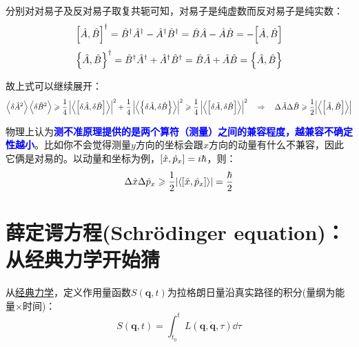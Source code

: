 分别对对易子及反对易子取复共轭可知，对易子是纯虚数而反对易子是纯实数：
\[\comm{\hat{A}}{\hat{B}}^{\dagger}=\hat{B}^{\dagger}\hat{A}^{\dagger}-\hat{A}^{\dagger}\hat{B}^{\dagger}=\hat{B}\hat{A}-\hat{A}\hat{B}=-\comm{\hat{A}}{\hat{B}}\]
\[\qty{\hat{A},\hat{B}}^{\dagger}=\hat{B}^{\dagger}\hat{A}^{\dagger}+\hat{A}^{\dagger}\hat{B}^{\dagger}=\hat{B}\hat{A}+\hat{A}\hat{B}=\qty{\hat{A},\hat{B}}\]

故上式可以继续展开：
\[\left \langle \delta\hat{A}^2 \right \rangle\left \langle \delta\hat{B}^2 \right \rangle \geqslant \frac{1}{4} \left | \left \langle \comm{\delta\hat{A}}{\delta\hat{B}} \right \rangle \right |^2 +\frac{1}{4} \left |\left \langle \qty{\delta\hat{A},\delta\hat{B}} \right \rangle \right |^2 \geqslant \frac{1}{4} \left | \left \langle \comm{\delta\hat{A}}{\delta\hat{B}} \right \rangle \right |^2 \quad \Rightarrow \quad \Delta \hat{A}\Delta \hat{B} \geqslant \frac{1}{2}\qty|\left \langle \comm{\hat{A}}{\hat{B}} \right \rangle|\]

物理上认为\textcolor{blue}{\textbf{测不准原理提供的是两个算符（测量）之间的兼容程度，越兼容不确定性越小}}。比如你不会觉得测量$y$方向的坐标会跟$x$方向的动量有什么不兼容，因此它俩是对易的。以动量和坐标为例，$\comm{\hat{x}}{\hat{p}_x}=i\hbar$，则：
\[\Delta \hat{x}\Delta \hat{p}_x \geqslant \frac{1}{2}\qty|\left \langle \comm{\hat{x}}{\hat{p}_x} \right \rangle|=\frac{\hbar}{2}\]

\section{薛定谔方程(Schrödinger equation)：从经典力学开始猜}
从\href{https://github.com/Astolfo-Official/Mathematics-in-Quantum-Chemistry/blob/main/%E3%80%8A%E9%87%8F%E5%AD%90%E5%8C%96%E5%AD%A6%E4%B8%AD%E7%9A%84%E6%95%B0%E5%AD%A6%E3%80%8B2.0.pdf}{经典力学}，定义作用量函数$S(\bm{q},t)$为拉格朗日量沿真实路径的积分(量纲为能量$\times$时间)：
\[S(\bm{q},t)=\int_{t_0}^{t} L(\bm{q},\dot{\bm{q}},\tau)\dd{\tau}\]

